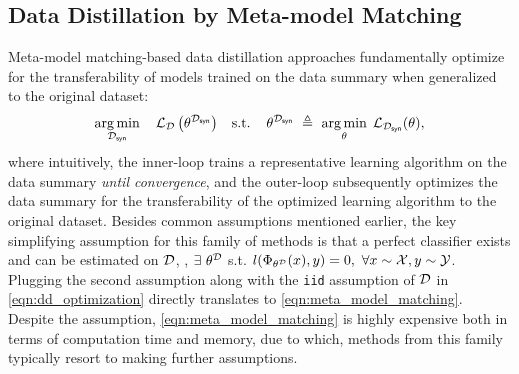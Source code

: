 \documentclass[10pt]{article} %
\begin{document}
\subsection{Data Distillation by Meta-model Matching} \label{sec:meta_model}
Meta-model matching-based data distillation approaches fundamentally optimize for the transferability of models trained on the data summary when generalized to the original dataset:
\begin{equation} \label{eqn:meta_model_matching}
\begin{gathered}
    \underset{\mathcal{D}_{\mathsf{syn}}}{\operatorname{arg} \operatorname{min}} \hspace{0.4cm} \mathcal{L}_{\mathcal{D}}\left(\theta^{\mathcal{D}_{\mathsf{syn}}}\right) \hspace{0.3cm}
    \text{s.t.} \hspace{0.4cm} \theta^{\mathcal{D}_{\mathsf{syn}}} ~ \triangleq ~ \underset{\theta}{\operatorname{arg} \operatorname{min}} \hspace{0.15cm} \mathcal{L}_{\mathcal{D}_{\mathsf{syn}}}(\theta),
\end{gathered}
\end{equation}
where intuitively, the inner-loop trains a representative learning algorithm on the data summary \emph{until convergence}, and the outer-loop subsequently optimizes the data summary for the transferability of the optimized learning algorithm to the original dataset. 
Besides common assumptions mentioned earlier, the key simplifying assumption for this family of methods is that a perfect classifier exists and can be estimated on $\mathcal{D}$, \ie, $\exists ~\theta^{\mathcal{D}}$ s.t. $l(\Phi_{\theta^{\mathcal{D}}}(x), y) = 0, ~ \forall x \sim \mathcal{X}, y \sim \mathcal{Y}$. Plugging the second assumption along with the \texttt{iid} assumption of $\mathcal{D}$ in \cref{eqn:dd_optimization} directly translates to \cref{eqn:meta_model_matching}. Despite the assumption, \cref{eqn:meta_model_matching} is highly expensive both in terms of computation time and memory, due to which, methods from this family typically resort to making further assumptions.
\end{document}
